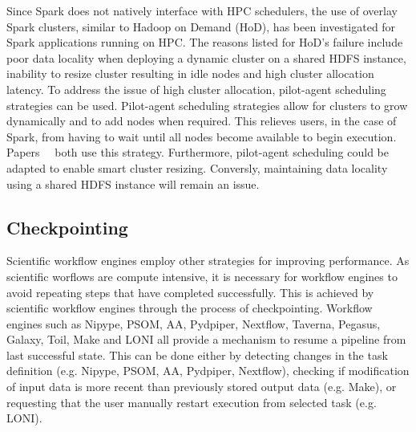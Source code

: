             Since Spark does not natively interface with HPC schedulers, 
            the use of overlay Spark clusters, similar to Hadoop on Demand 
            (HoD), has been 
            investigated for Spark applications running on HPC. The reasons 
            listed for HoD's failure include poor 
            data locality when deploying a dynamic cluster on a shared HDFS 
            instance, inability to resize cluster resulting in idle nodes and 
            high cluster allocation latency. To address the issue of high 
            cluster allocation, pilot-agent scheduling strategies can be used.
            Pilot-agent scheduling strategies allow for clusters to grow 
            dynamically and to add nodes when required. This relieves users, 
            in the case of Spark, from having to wait until all nodes become 
            available to begin execution. 
            Papers~\cite{7530058}~\cite{Baer:2015:IAS:2792745.2792779} both use 
            this strategy. Furthermore, pilot-agent scheduling could be adapted
            to enable smart cluster resizing. Conversly, maintaining data 
            locality using a shared HDFS instance will remain an issue. 
         

        \subsection{Checkpointing}\label{other}                                    
                                                                                
            Scientific workflow engines employ other strategies for improving   
            performance. As scientific worflows are compute intensive, it is    
            necessary for workflow engines to avoid repeating steps that have   
            completed successfully. This is achieved by scientific workflow     
            engines through the process of checkpointing. Workflow engines such 
            as Nipype, PSOM, AA, Pydpiper, Nextflow, Taverna, Pegasus, Galaxy,  
            Toil, Make and LONI all provide a mechanism to resume a pipeline    
            from last successful state. This can be done either by detecting    
            changes in the task definition (e.g. Nipype, PSOM, AA, Pydpiper,    
            Nextflow), checking if modification of input                        
            data is more recent than previously stored output data (e.g. Make), 
            or requesting that the user manually restart execution from         
            selected task (e.g. LONI).                                          
                                                                                
